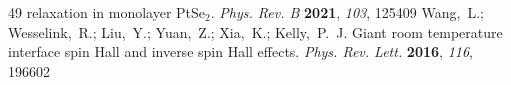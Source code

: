 \documentclass[journal=jacsat,manuscript=article]{achemso}
\begin{document}
\begin{mcitethebibliography}{49}
  relaxation in monolayer PtSe$_2$. \emph{Phys. Rev. B} \textbf{2021},
  \emph{103}, 125409\relax
\mciteBstWouldAddEndPuncttrue
\mciteSetBstMidEndSepPunct{\mcitedefaultmidpunct}
{\mcitedefaultendpunct}{\mcitedefaultseppunct}\relax
\EndOfBibitem
{}
Wang,~L.; Wesselink,~R.; Liu,~Y.; Yuan,~Z.; Xia,~K.; Kelly,~P.~J. Giant room
  temperature interface spin Hall and inverse spin Hall effects. \emph{Phys.
  Rev. Lett.} \textbf{2016}, \emph{116}, 196602\relax
\mciteBstWouldAddEndPuncttrue
\mciteSetBstMidEndSepPunct{\mcitedefaultmidpunct}
{\mcitedefaultendpunct}{\mcitedefaultseppunct}\relax
\EndOfBibitem
\end{mcitethebibliography}



  
\end{document}
